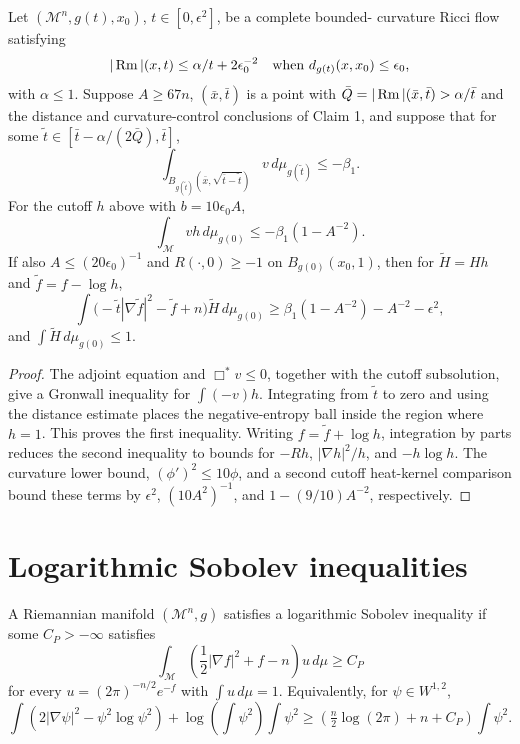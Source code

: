\begin{lemma}
\label{lem:chow-iii-local-entropy-upper-bound}


Let \((\mathcal M^n,g(t),x_0)\), \(t\in[0,\epsilon^2]\), be a complete bounded-
curvature Ricci flow satisfying
\[
 |\operatorname{Rm}|(x,t)\le\alpha/t+2\epsilon_0^{-2}
\quad\text{when }d_{g(t)}(x,x_0)\le\epsilon_0,
\]
with \(\alpha\le1\).  Suppose \(A\ge67n\), \((\bar x,\bar t)\) is a point
with \(\bar Q=|\operatorname{Rm}|(\bar x,\bar t)>\alpha/\bar t\) and the distance and
curvature-control conclusions of Claim 1, and suppose that for some
\(\tilde t\in[\bar t-\alpha/(2\bar Q),\bar t]\),
\[
 \int_{B_{g(\tilde t)}(\bar x,\sqrt{\bar t-\tilde t})}v\,d\mu_{g(\tilde t)}\le-\beta_1.
\]
For the cutoff \(h\) above with \(b=10\epsilon_0A\),
\[
 \int_{\mathcal M}v h\,d\mu_{g(0)}
 \le-\beta_1(1-A^{-2}).
\]
If also \(A\le(20\epsilon_0)^{-1}\) and \(R(\cdot,0)\ge-1\) on
\(B_{g(0)}(x_0,1)\), then for \(\widetilde H=Hh\) and
\(\widetilde f=f-\log h\),
\[
 \int\bigl(-\tilde t|\nabla\widetilde f|^2-\widetilde f+n\bigr)\widetilde H\,d\mu_{g(0)}
 \ge \beta_1(1-A^{-2})-A^{-2}-\epsilon^2,
\]
and \(\int\widetilde H\,d\mu_{g(0)}\le1\).
\end{lemma}
\begin{proof}
\sketch The adjoint equation and \(\Box^*v\le0\), together with the cutoff
subsolution, give a Gronwall inequality for \(\int(-v)h\).  Integrating from
\(\tilde t\) to zero and using the distance estimate places the negative-entropy
ball inside the region where \(h=1\).  This proves the first inequality.  Writing
\(f=\widetilde f+\log h\), integration by parts reduces the second inequality
to bounds for \(-Rh\), \(|\nabla h|^2/h\), and \(-h\log h\).  The curvature lower bound,
\((\phi')^2\le10\phi\), and a second cutoff heat-kernel comparison bound these
terms by \(\epsilon^2\), \((10A^2)^{-1}\), and \(1-(9/10)A^{-2}\), respectively.
\end{proof}

\section{Logarithmic Sobolev inequalities}

\begin{definition}
\label{def:chow-iii-log-sobolev}

A Riemannian manifold \((\mathcal M^n,g)\) satisfies a logarithmic Sobolev
inequality if some \(C_P>-\infty\) satisfies
\[
 \int_{\mathcal M}\left(\frac12|\nabla f|^2+f-n\right)u\,d\mu\ge C_P
\]
for every \(u=(2\pi)^{-n/2}e^{-f}\) with \(\int u\,d\mu=1\).  Equivalently,
for \(\psi\in W^{1,2}\),
\[
 \int(2|\nabla\psi|^2-\psi^2\log\psi^2)
 +\log\!\left(\int\psi^2\right)\int\psi^2
 \ge\left(\tfrac n2\log(2\pi)+n+C_P\right)\int\psi^2.
\]
\end{definition}

